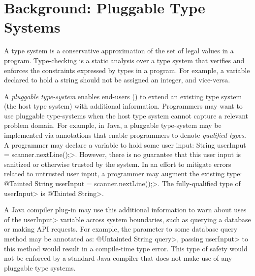 \section{Background: Pluggable Type Systems}
\label{sec:background}

A type system is a conservative approximation of the set of legal values in a
program.
Type-checking is a static analysis over a type system that verifies and
enforces the constraints expressed by types in a program.
For example, a variable declared to hold a string should not be assigned an
integer, and vice-versa.

A \textit{pluggable type-system} enables end-users () to
extend an existing type system (the host type system) with additional
information.
Programmers may want to use pluggable type-systems when the host type system
cannot capture a relevant problem domain.
For example, in Java, a pluggable type-system may be implemented via
annotations that enable programmers to denote \textit{qualified types}.
A programmer may declare a variable to hold some user input:
\<String userInput = scanner.nextLine();>.
However, there is no guarantee that this user input is sanitized or otherwise
trusted by the system.
In an effort to mitigate errors related to untrusted user input, a programmer
may augment the existing type: \<@Tainted String userInput = scanner.nextLine();>.
The fully-qualified type of \<userInput> is \<@Tainted String>.

A Java compiler plug-in may use this additional information to warn about uses
of the \<userInput> variable across system boundaries, such as querying a
database or making API requests.
For example, the parameter to some database query method may be annotated
as: \<@Untainted String query>, passing \<userInput> to this method would
result in a compile-time type error.
This type of safety would not be enforced by a standard Java compiler that does
not make use of any pluggable type systems.

